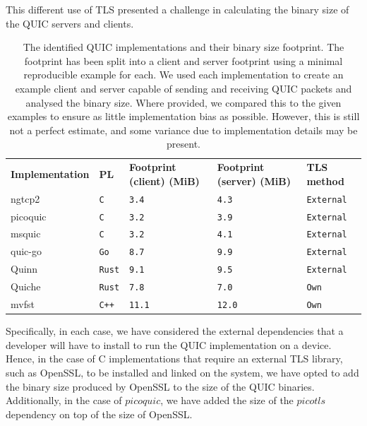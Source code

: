 This different use of TLS presented a challenge in calculating the binary size of the QUIC servers and clients.

\begin{table}[ht]
    \caption{The identified QUIC implementations and their binary size footprint. The footprint has been split into a client and server footprint using a minimal reproducible example for each. We used each implementation to create an example client and server capable of sending and receiving QUIC packets and analysed the binary size. Where provided, we compared this to the given examples to ensure as little implementation bias as possible. However, this is still not a perfect estimate, and some variance due to implementation details may be present.}\label{tab:quics}
    \begin{tabular}{@{}lllll@{}}
        \toprule
        \textbf{Implementation} & \textbf{PL}   & \textbf{Footprint (client) (MiB)} & \textbf{Footprint (server) (MiB)} & \textbf{TLS method} \\
        ngtcp2                  & \texttt{C}    & \texttt{3.4}                      & \texttt{4.3}                      & \texttt{External}   \\
        picoquic                & \texttt{C}    & \texttt{3.2}                      & \texttt{3.9}                      & \texttt{External}   \\
        msquic                  & \texttt{C}    & \texttt{3.2}                      & \texttt{4.1}                      & \texttt{External}   \\
        quic-go                 & \texttt{Go}   & \texttt{8.7}                      & \texttt{9.9}                      & \texttt{External}   \\
        Quinn                   & \texttt{Rust} & \texttt{9.1}                      & \texttt{9.5}                      & \texttt{External}   \\
        Quiche                  & \texttt{Rust} & \texttt{7.8}                      & \texttt{7.0}                      & \texttt{Own}        \\
        mvfst                   & \texttt{C++}  & \texttt{11.1}                     & \texttt{12.0}                     & \texttt{Own}        \\
        \bottomrule
    \end{tabular}
\end{table}

Specifically, in each case, we have considered the external dependencies that a developer will have to install to run the QUIC implementation on a device.
Hence, in the case of C implementations that require an external TLS library, such as OpenSSL, to be installed and linked on the system, we have opted to add the binary size produced by OpenSSL to the size of the QUIC binaries.
Additionally, in the case of $picoquic$, we have added the size of the $picotls$ dependency on top of the size of OpenSSL.


